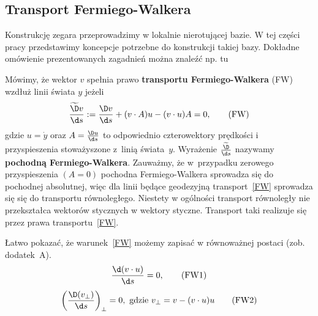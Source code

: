 \subsection{Transport Fermiego-Walkera}
Konstrukcję zegara przeprowadzimy w lokalnie nierotującej bazie. W tej części
pracy przedstawimy koncepcje potrzebne do konstrukcji takiej bazy. Dokładne 
omówienie prezentowanych zagadnień można znaleźć np. 
tu~\cite{synge1960, FWframesconstruct}
\begin{definition}Mówimy, że wektor $v$ spełnia prawo \textbf{transportu 
Fermiego-Walkera} (FW) wzdłuż linii świata $y$ jeżeli
\begin{align} 
\frac{\widetilde{\D} v}{\d s}  : = \frac{\D v}{\d s} +
(v\cdot A) u - (v\cdot u) A = 0, \tag{FW} \label{FW}
\end{align}
gdzie $u = \dot{y}$ oraz $A=\frac{\D u}{\d s}$ to odpowiednio czterowektory
prędkości i przyspieszenia stoważyszone z~linią świata~$y$.
Wyrażenie $ \frac{\widetilde{\D} }{\d s}$ nazywamy \textbf{pochodną
Fermiego-Walkera}. Zauważmy, że w~przypadku zerowego przyspieszenia $(A=0)$
pochodna Fermiego-Walkera sprowadza się do pochodnej absolutnej, więc 
dla linii będące geodezyjną transport~\eqref{FW} sprowadza się się do 
transportu równoległego.
Niestety w ogólności transport równoległy
nie przekształca wektorów stycznych w wektory styczne. Transport taki 
 realizuje się przez prawa transportu~\eqref{FW}. 
\end{definition}
Łatwo pokazać, że warunek~\eqref{FW} możemy zapisać w równoważnej postaci 
(zob. dodatek~A).
\begin{align}
\frac{\d (v \cdot u)}{\d s}=0, \tag{FW1} \label{FW1}
\end{align}
\begin{align}
\left(\frac{\D (v_\perp)}{\d s}\right)_\perp = 0, 
\text{ gdzie } v_\perp = v-(v\cdot u)u \tag{FW2} \label{FW2}
\end{align}


